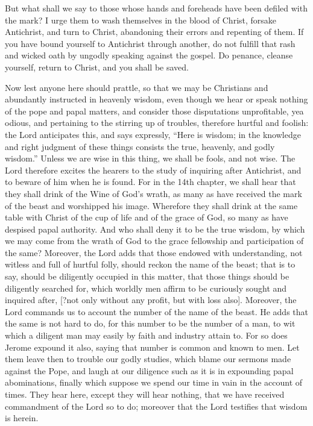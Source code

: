 But what shall we say to those whose hands and foreheads have been defiled with the mark? I urge them to wash themselves in the blood of Christ, forsake Antichrist, and turn to Christ, abandoning their errors and repenting of them. If you have bound yourself to Antichrist through another, do not fulfill that rash and wicked oath by ungodly speaking against the gospel. Do penance, cleanse yourself, return to Christ, and you shall be saved.

Now lest anyone here should prattle, so that we may be Christians and abundantly instructed in heavenly wisdom, even though we hear or speak nothing of the pope and papal matters, and consider those disputations unprofitable, yea odious, and pertaining to the stirring up of troubles, therefore hurtful and foolish: the Lord anticipates this, and says expressly, “Here is wisdom; in the knowledge and right judgment of these things consists the true, heavenly, and godly wisdom.” Unless we are wise in this thing, we shall be fools, and not wise. The Lord therefore excites the hearers to the study of inquiring after Antichrist, and to beware of him when he is found. For in the 14th chapter, we shall hear that they shall drink of the Wine of God’s wrath, as many as have received the mark of the beast and worshipped his image. Wherefore they shall drink at the same table with Christ of the cup of life and of the grace of God, so many as have despised papal authority. And who shall deny it to be the true wisdom, by which we may come from the wrath of God to the grace fellowship and participation of the same? Moreover, the Lord adds that those endowed with understanding, not witless and full of hurtful folly, should reckon the name of the beast; that is to say, should be diligently occupied in this matter, that those things should be diligently searched for, which worldly men affirm to be curiously sought and inquired after, [?not only without any profit, but with loss also]. Moreover, the Lord commands us to account the number of the name of the beast. He adds that the same is not hard to do, for this number to be the number of a man, to wit which a diligent man may easily by faith and industry attain to. For so does Jerome expound it also, saying that number is common and known to men. Let them leave then to trouble our godly studies, which blame our sermons made against the Pope, and laugh at our diligence such as it is in expounding papal abominations, finally which suppose we spend our time in vain in the account of times. They hear here, except they will hear nothing, that we have received commandment of the Lord so to do; moreover that the Lord testifies that wisdom is herein.

